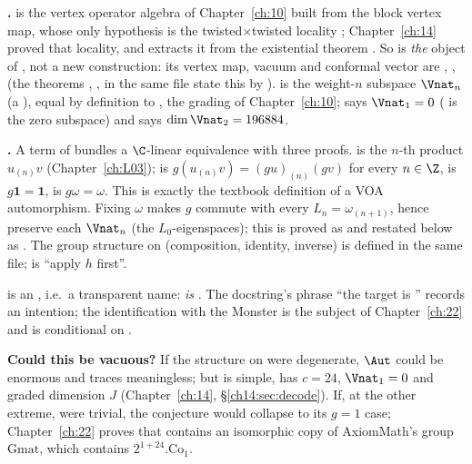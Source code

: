 \begin{dictionary}
\textbf{.}   is the vertex operator algebra of Chapter~\ref{ch:10} built from the
block vertex map, whose only hypothesis is the twisted$\times$twisted locality ; Chapter~\ref{ch:14}
proved that locality, and  extracts it from the existential theorem
.  So  is \emph{the} object of , not a new construction: its vertex map,
vacuum and conformal vector are , ,  (the theorems
, ,  in the same file state this by ).
 is the weight-$n$ subspace $\Vnat_n$ (a ), equal by definition to
, the grading of Chapter~\ref{ch:10};  says $\Vnat_1=0$ ( is
the zero subspace) and  says $\dim\Vnat_2=196884$.

\textbf{.}  A term of  bundles a $\C$-linear equivalence  with three
proofs.   is the $n$-th product $u_{(n)}v$ (Chapter~\ref{ch:L03});  is
$g(u_{(n)}v)=(gu)_{(n)}(gv)$ for every $n\in\Z$,  is $g\mathbf 1=\mathbf 1$,  is
$g\omega=\omega$.  This is exactly the textbook definition of a VOA automorphism.  Fixing $\omega$ makes $g$ commute
with every $L_n=\omega_{(n+1)}$, hence preserve each $\Vnat_n$ (the $L_0$-eigenspaces); this is proved as
 and restated below as .  The group structure on
 (composition, identity, inverse) is defined in the same file;  is ``apply $h$ first''.

\textbf{} is an , i.e.\ a transparent name:  \emph{is} .
The docstring's phrase ``the target is '' records an intention; the identification with
the Monster is the subject of Chapter~\ref{ch:22} and is conditional on .

\textbf{Could this be vacuous?}  If the structure on  were degenerate, $\Aut$ could be enormous and
traces meaningless; but  is simple, has $c=24$, $\Vnat_1=0$ and graded dimension $J$
(Chapter~\ref{ch:14}, \S\ref{ch14:sec:decode}).  If, at the other extreme,  were trivial, the
conjecture would collapse to its $g=1$ case; Chapter~\ref{ch:22} proves that  contains an isomorphic
copy of AxiomMath's group $\mathrm{Gmat}$, which contains $2^{1+24}.\mathrm{Co}_1$.
\end{dictionary}
